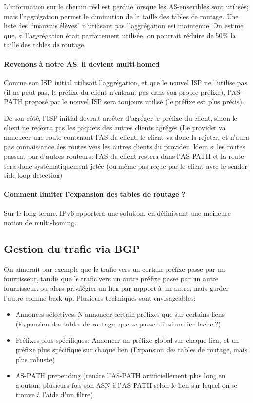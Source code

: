 \documentclass{report}
\begin{document}
L'information sur le chemin réel est perdue lorsque les AS-ensembles
sont utilisés; mais l'aggrégation permet le diminution de la taille
des tables de routage. Une liste des ``mauvais élèves'' n'utilisant
pas l'aggrégation est maintenue. On estime que, si l'aggrégation était
parfaitement utilisée, on pourrait réduire de 50\% la taille des
tables de routage.

\paragraph{Revenons à notre AS, il devient multi-homed}

Comme son ISP initial utilisait l'aggrégation, et que le nouvel ISP ne
l'utilise pas (il ne peut pas, le préfixe du client n'entrant pas dans
son propre préfixe), l'AS-PATH proposé par le nouvel ISP sera toujours
utilisé (le préfixe est plus précis).

De son côté, l'ISP initial devrait arrêter d'agréger le préfixe du
client, sinon le client ne recevra pas les paquets des autres clients
agrégés (Le provider va annoncer une route contenant l'AS du client,
le client va donc la rejeter, et n'aura pas connaissance des routes
vers les autres clients du provider. Idem si les routes passent par
d'autres routeurs: l'AS du client restera dans l'AS-PATH et la route
sera donc systématiquement jetée (ou même pas reçue par le client avec
le sender-side loop detection)

\paragraph{Comment limiter l'expansion des tables de routage ?}

Sur le long terme, IPv6 apportera une solution, en définissant une
meilleure notion de multi-homing.

\subsection{Gestion du trafic via BGP}

On aimerait par exemple que le trafic vers un certain préfixe passe
par un fournisseur, tandis que le trafic vers un autre préfixe passe
par un autre fournisseur, ou alors privilégier un lien par rapport à
un autre, mais garder l'autre comme back-up. Plusieurs techniques sont
envisageables:

\begin{itemize}
\item Annonces sélectives: N'annoncer certain préfixes que sur
  certains liens (Expansion des tables de routage, que se passe-t-il
  si un lien lache ?)
\item Préfixes plus spécifiques: Annoncer un préfixe global sur chaque
  lien, et un préfixe plus spécifique sur chaque lien (Expansion des
  tables de routage, mais plus robuste)
\item AS-PATH prepending (rendre l'AS-PATH artificiellement plus long
  en ajoutant plusieurs fois son ASN à l'AS-PATH selon le lien sur
  lequel on se trouve à l'aide d'un filtre)
\end{itemize}
\end{document}
